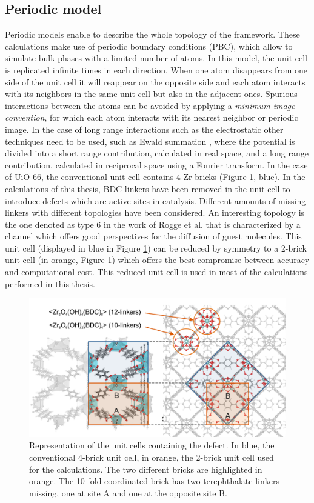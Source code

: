 \subsection*{Periodic model}
Periodic models enable to describe the whole topology of the framework. These calculations make use of periodic boundary conditions (PBC), which allow to simulate bulk phases with a limited number of atoms. In this model, the unit cell is replicated infinite times in each direction. When one atom disappears from one side of the unit cell it will reappear on the opposite side and each atom interacts with its neighbors in the same unit cell but also in the adjacent ones. Spurious interactions between the atoms can be avoided by applying a \textit{minimum image convention}, for which each atom interacts with its nearest neighbor or periodic image. In the case of long range interactions such as the electrostatic other techniques need to be used, such as Ewald summation \cite{Ewald1921}, where the potential is divided into a short range contribution, calculated in real space, and a long range contribution, calculated in reciprocal space using a Fourier transform. 
In the case of UiO-66, the conventional unit cell\cite{Cavka2008} contains 4 Zr bricks (Figure \ref{fig:periodic}, blue). In the calculations of this thesis, BDC linkers have been removed in the unit cell to introduce defects which are active sites in catalysis. Different amounts of missing linkers with different topologies have been considered. An interesting topology is the one denoted as type 6 in the work of Rogge et al.\cite{Rogge2017} that is characterized by a channel which offers good perspectives for the diffusion of guest molecules. This unit cell (displayed in blue in Figure \ref{fig:periodic}) can be reduced by symmetry to a 2-brick unit cell (in orange, Figure \ref{fig:periodic}) which offers the best compromise between accuracy and computational cost. This reduced unit cell is used in most of the calculations performed in this thesis.

\begin{figure}[!htbp]
	\centering
 	\includegraphics[width=1.0\textwidth]{periodic}
	\caption{Representation of the unit cells containing the defect. In blue, the conventional 4-brick unit cell, in orange, the 2-brick unit cell used for the calculations. The two different bricks are highlighted in orange. The 10-fold coordinated brick has two terephthalate linkers missing, one at site A and one at the opposite site B.}
	\label{fig:periodic}
\end{figure}

